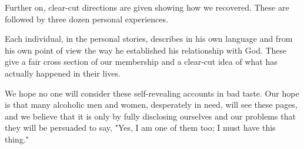 Further on, clear-cut directions are given showing how we recovered. 
These are followed by three dozen personal experiences.

Each individual, in the personal stories, describes in his own language and from his own point of view the way he established his relationship with God. 
These give a fair cross section of our membership 
and a clear-cut idea of what has actually happened in their lives.

We hope no one will consider these self-revealing accounts in bad taste. 
Our hope is that many alcoholic men and women, desperately in need, will see these pages, 
and we believe that it is only by fully disclosing ourselves and our problems that they will be persuaded to say, 
"Yes, I am one of them too; I must have this thing."

